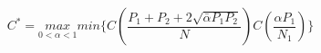 \documentclass[preview]{standalone}
\begin{document}
\begin{center}
\[C^{*}= \underset{0<\alpha<1}{max}min\{C(\frac{P_1+P_2+2\sqrt{\bar{\alpha}P_1P_2}}{N})C(\frac{\alpha P_1}{N_1})\}\]
\end{center}
\end{document}
